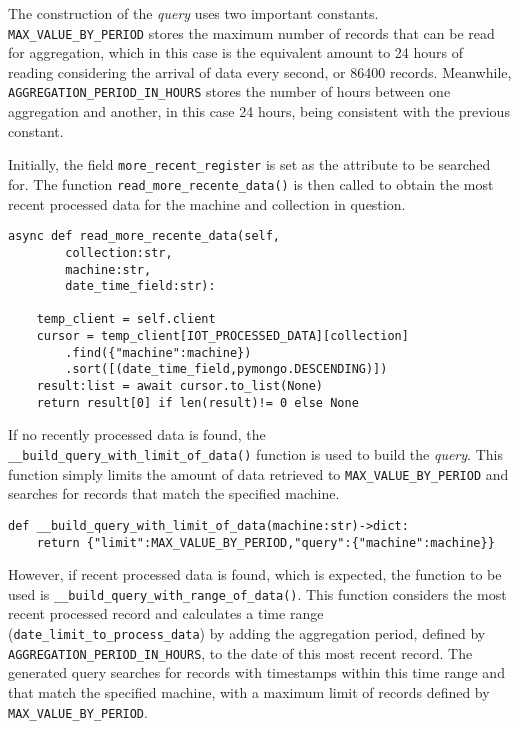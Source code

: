 The construction of the \textit{query} uses two important constants. \texttt{MAX\_VALUE\_BY\_PERIOD} stores the maximum number of records that can be read for aggregation, which in this case is the equivalent amount to 24 hours of reading considering the arrival of data every second, or 86400 records. Meanwhile, \texttt{AGGREGATION\_PERIOD\_IN\_HOURS} stores the number of hours between one aggregation and another, in this case 24 hours, being consistent with the previous constant.

Initially, the field \texttt{more\_recent\_register} is set as the attribute to be searched for. The function \texttt{read\_more\_recente\_data()} is then called to obtain the most recent processed data for the machine and collection in question.

\begin{Verbatim}[fontsize=\small, baselinestretch=0.8]
async def read_more_recente_data(self,
        collection:str,
        machine:str,
        date_time_field:str):

    temp_client = self.client
    cursor = temp_client[IOT_PROCESSED_DATA][collection]
        .find({"machine":machine})
        .sort([(date_time_field,pymongo.DESCENDING)])
    result:list = await cursor.to_list(None)
    return result[0] if len(result)!= 0 else None
\end{Verbatim}

If no recently processed data is found, the \texttt{\_\_build\_query\_with\_limit\_of\_data()} function is used to build the \textit{query}. This function simply limits the amount of data retrieved to \texttt{MAX\_VALUE\_BY\_PERIOD} and searches for records that match the specified machine.

\begin{Verbatim}[fontsize=\small, baselinestretch=0.8]
def __build_query_with_limit_of_data(machine:str)->dict:
    return {"limit":MAX_VALUE_BY_PERIOD,"query":{"machine":machine}}
\end{Verbatim}


However, if recent processed data is found, which is expected, the function to be used is \texttt{\_\_build\_query\_with\_range\_of\_data()}. This function considers the most recent processed record and calculates a time range (\texttt{date\_limit\_to\_process\_data}) by adding the aggregation period, defined by \texttt{AGGREGATION\_PERIOD\_IN\_HOURS}, to the date of this most recent record. The generated query searches for records with timestamps within this time range and that match the specified machine, with a maximum limit of
records defined by \texttt{MAX\_VALUE\_BY\_PERIOD}.

